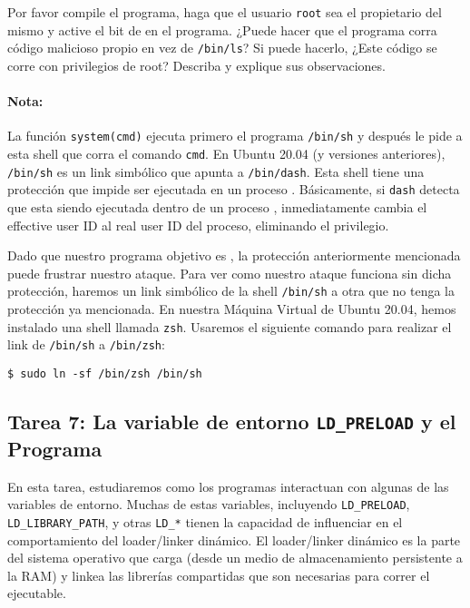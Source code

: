Por favor compile el programa, haga que el usuario {\tt root} sea el propietario del mismo y active el bit de \setuid en el programa. ¿Puede hacer que el programa \setuid corra código malicioso propio en vez de {\tt /bin/ls}? Si puede hacerlo, ¿Este código se corre con privilegios de root?
Describa y explique sus observaciones.


\paragraph{Nota:}
La función \texttt{system(cmd)} ejecuta primero el programa \texttt{/bin/sh} y después le pide a esta shell que corra el comando \texttt{cmd}.
En Ubuntu 20.04 (y versiones anteriores), \texttt{/bin/sh} es un link simbólico que apunta a \texttt{/bin/dash}.
Esta shell tiene una protección que impide ser ejecutada en un proceso \setuid. Básicamente, si \texttt{dash} detecta que esta siendo ejecutada dentro de un proceso \setuid, inmediatamente cambia el effective user ID al real user ID del proceso, eliminando el privilegio.

Dado que nuestro programa objetivo es \setuid, la protección anteriormente mencionada puede frustrar nuestro ataque.
Para ver como nuestro ataque funciona sin dicha protección, haremos un link simbólico de la shell \texttt{/bin/sh} a otra que no tenga la protección ya mencionada. En nuestra Máquina Virtual de Ubuntu 20.04, hemos instalado una shell llamada \texttt{zsh}. Usaremos el siguiente comando para realizar el link de \texttt{/bin/sh} a \texttt{/bin/zsh}:


\begin{lstlisting}
$ sudo ln -sf /bin/zsh /bin/sh
\end{lstlisting}


\subsection{Tarea 7: La variable de entorno {\tt LD\_PRELOAD} y el Programa \setuid}

En esta tarea, estudiaremos como los programas \setuid interactuan con algunas de las variables de entorno.
Muchas de estas variables, incluyendo {\tt LD\_PRELOAD}, {\tt LD\_LIBRARY\_PATH}, y otras {\tt LD\_*} tienen la capacidad de influenciar en el comportamiento del loader/linker dinámico.
El loader/linker dinámico es la parte del sistema operativo que carga (desde un medio de almacenamiento persistente a la RAM) y linkea las librerías compartidas que son necesarias para correr el ejecutable.

